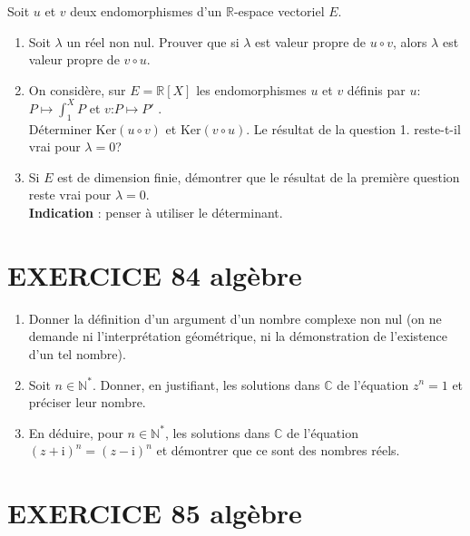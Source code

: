 \documentclass[10pt,oneside]{article}
\begin{document}
\begin{flushleft}

Soit $u$ et $v$ deux endomorphismes d'un $\mathbb{R}$-espace vectoriel $E$.

\begin{enumerate}
\item Soit $\lambda$ un réel non nul. Prouver que si $\lambda$ est valeur propre de $u\circ v$, alors $\lambda$ est valeur propre de $v\circ u$.\\
\:\:\:\:
\item On considère, sur $E=\mathbb{R}\left[ X\right] $ les endomorphismes $u$ et $v$ définis par 
$u$:\:$P\longmapsto \displaystyle\int_{1}^{X}P $ et $v$:\:$P\longmapsto P'$ .\\
Déterminer $ \mathrm{Ker} (u\circ v)$ et $\mathrm{Ker} (v\circ u)$.
Le résultat de la question 1. reste-t-il vrai pour $\lambda=0$?\:\:\:\:
\item 
Si $E$ est de dimension finie, démontrer que le résultat de la première question reste vrai pour $\lambda=0$.\\
\textbf{Indication }: penser à utiliser le déterminant.\:\:\:\:

\end{enumerate}
\section*{EXERCICE 84 \: algèbre}



\begin{enumerate}
\item Donner la définition d'un argument d'un nombre complexe non nul (on ne demande ni l'interprétation géométrique, ni la démonstration de l'existence d'un tel nombre).
\item Soit $n\in{\mathbb{N}^{*}}$. Donner, en justifiant, les solutions dans  $\mathbb{C} $ de l'équation $z^{n}=1$ et préciser leur nombre.
\item En déduire, pour $n\in{\mathbb{N}^{*}}$, les solutions dans $\mathbb{C}$ de l'équation $\left( z+\mathrm{i}\right)^{n}=\left(z-\mathrm{i}\right)^{n}$ et démontrer que ce sont des nombres réels.
\end{enumerate}

\section*{EXERCICE 85\: algèbre}


\end{flushleft}
\end{document}
